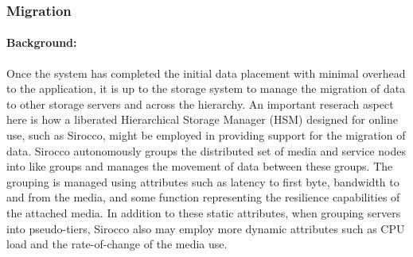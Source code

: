 \subsubsection{Migration}
\label{sec:migration}

\paragraph{Background:} 
Once the system has completed the initial data placement with minimal
overhead to the application, it is up to the storage system to manage the
migration of data to other storage servers and across the hierarchy. An
important reserach aspect here is how a liberated Hierarchical Storage
Manager (HSM) designed for online use, such as Sirocco, might be employed in
providing support for the migration of data. Sirocco autonomously groups the
distributed set of media and service nodes into like groups and manages the
movement of data between these groups. The grouping is managed using
attributes such as latency to first byte, bandwidth to and from the media, and
some function representing the resilience capabilities of the attached media.
In addition to these static attributes, when grouping servers into
pseudo-tiers, Sirocco also may employ more dynamic attributes such as CPU load
and the rate-of-change of the media use. 

